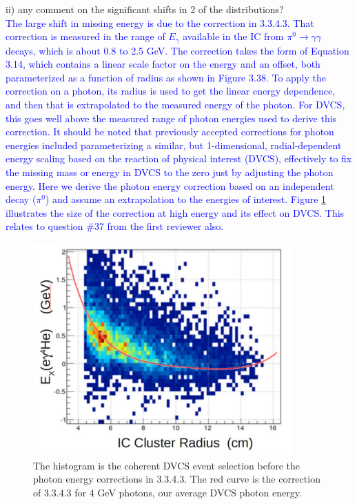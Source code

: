 ii) any comment on the significant shifts in 2 of the distributions?\\
\textcolor{blue}{ The large shift in missing energy is due to the correction in
3.3.4.3.  That correction is measured in the range of $E_\gamma$ available in
the IC from $\pi^0\to\gamma\gamma$ decays, which is about 0.8 to 2.5 GeV.
The correction takes the form of Equation 3.14, which contains a linear scale
factor on the energy and an offset, both parameterized as a function of radius
as shown in Figure 3.38.  To apply the correction on a photon, its radius is
used to get the linear energy dependence, and then that is extrapolated to
the measured energy of the photon.  For DVCS, this goes well above the measured
range of photon energies used to derive this correction.  It should be noted
that previously accepted corrections for photon energies included parameterizing
a similar, but 1-dimensional, radial-dependent energy scaling based on the
reaction of physical interest (DVCS), effectively to fix the missing mass or
energy in DVCS to the zero just by adjusting the photon energy.  Here we derive
the photon energy correction based on an independent decay ($\pi^0$) and assume
an extrapolation to the energies of interest.  Figure \ref{fig:exprepostcorr}
illustrates the size of the correction at high energy and its effect on DVCS.
This relates to question \#37 from the first reviewer also. }\\

\begin{figure}[htbp]\centering
  \includegraphics[width=10cm]{fig/exprepostcorr.png}
  \caption{The histogram is the coherent DVCS event selection before the photon 
     energy corrections in 3.3.4.3.  The red curve is the correction of 3.3.4.3 
  for 4 GeV photons, our average DVCS photon energy.\label{fig:exprepostcorr}}
\end{figure}

